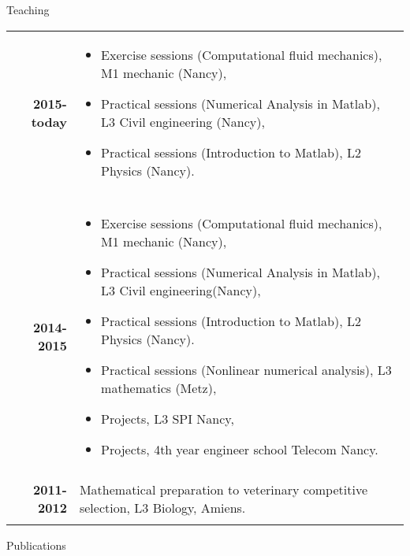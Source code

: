\documentclass[10pt,a4paper]{report}
\begin{document}
\vspace{1cm}
\noindent
{\selectfont
\begin{Large}
Teaching
\end{Large}
\hrulefill
}

\vspace{0.6cm}
\noindent
\begin{center}
\begin{tabular}{r p{12cm}}
\textbf{2015-today} & \begin{itemize}
\item Exercise sessions (Computational fluid mechanics), M1 mechanic (Nancy),
\item Practical sessions (Numerical Analysis in Matlab), L3 Civil engineering (Nancy),
\item Practical sessions (Introduction to Matlab), L2 Physics (Nancy).
\end{itemize}\\

& \\

\textbf{2014-2015} & \begin{itemize}
\item Exercise sessions (Computational fluid mechanics), M1 mechanic (Nancy),
\item Practical sessions (Numerical Analysis in Matlab), L3 Civil engineering(Nancy),
\item Practical sessions (Introduction to Matlab), L2 Physics (Nancy).
\item Practical sessions (Nonlinear numerical analysis), L3 mathematics (Metz),
\item Projects, L3 SPI Nancy,
\item Projects, 4th year engineer school Telecom Nancy.
\end{itemize}\\

& \\

\textbf{2011-2012} & Mathematical preparation to veterinary competitive selection, L3 Biology, Amiens.\\

& \\
\end{tabular}
\end{center}

\vspace{1cm}
\noindent
{\selectfont
\begin{Large}
Publications
\end{Large}
\hrulefill
}
\end{document}
